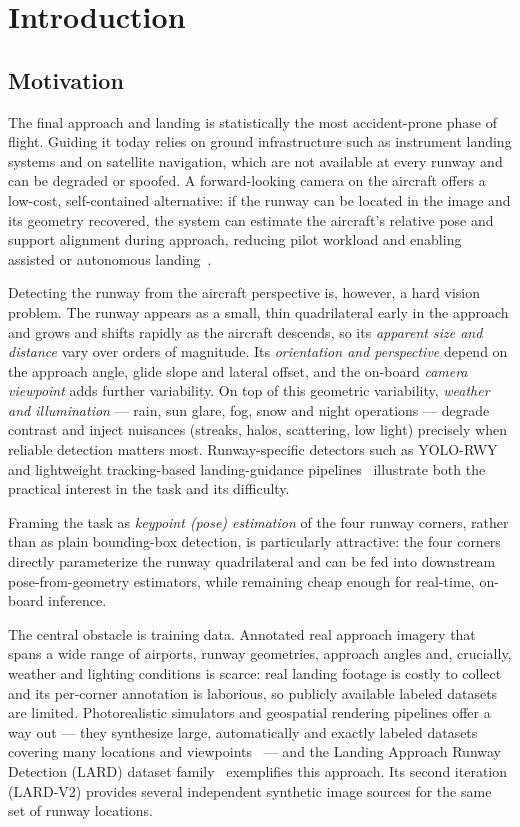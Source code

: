 \section{Introduction}
\label{sec:introduction}

\subsection{Motivation}
\label{subsec:motivation}
The final approach and landing is statistically the most accident-prone phase of
flight. Guiding it today relies on ground infrastructure such as instrument landing
systems and on satellite navigation, which are not available at every runway and can
be degraded or spoofed. A forward-looking camera on the aircraft offers a low-cost,
self-contained alternative: if the runway can be located in the image and its
geometry recovered, the system can estimate the aircraft's relative pose and support
alignment during approach, reducing pilot workload and enabling assisted or
autonomous landing~\cite{ferreira2025landing}.

Detecting the runway from the aircraft perspective is, however, a hard vision
problem. The runway appears as a small, thin quadrilateral early in the approach and
grows and shifts rapidly as the aircraft descends, so its \emph{apparent size and
distance} vary over orders of magnitude. Its \emph{orientation and perspective}
depend on the approach angle, glide slope and lateral offset, and the on-board
\emph{camera viewpoint} adds further variability. On top of this geometric
variability, \emph{weather and illumination} --- rain, sun glare, fog, snow and night
operations --- degrade contrast and inject nuisances (streaks, halos, scattering,
low light) precisely when reliable detection matters most. Runway-specific detectors
such as YOLO-RWY~\cite{yolorwy2024} and lightweight tracking-based landing-guidance
pipelines~\cite{ferreira2025landing, runwaysurveillance2026} illustrate both the
practical interest in the task and its difficulty.

Framing the task as \emph{keypoint (pose) estimation} of the four runway corners,
rather than as plain bounding-box detection, is particularly attractive: the four
corners directly parameterize the runway quadrilateral and can be fed into downstream
pose-from-geometry estimators, while remaining cheap enough for real-time, on-board
inference.

The central obstacle is training data. Annotated real approach imagery that spans a
wide range of airports, runway geometries, approach angles and, crucially, weather
and lighting conditions is scarce: real landing footage is costly to collect and its
per-corner annotation is laborious, so publicly available labeled datasets are
limited. Photorealistic simulators and geospatial rendering pipelines offer a way
out --- they synthesize large, automatically and exactly labeled datasets covering
many locations and viewpoints~\cite{syntheticrunway2025} --- and the Landing Approach
Runway Detection (LARD) dataset family~\cite{lard2023} exemplifies this approach. Its
second iteration (LARD-V2) provides several independent synthetic image sources for
the same set of runway locations.

